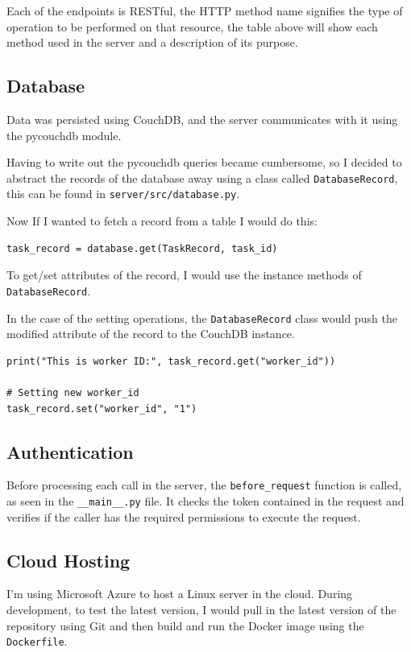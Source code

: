Each of the endpoints is RESTful, the HTTP method name signifies
the type of operation to be performed on that resource,
the table above will show each method used in the server
and a description of its purpose.

\subsection{Database}
Data was persisted using CouchDB,
and the server communicates with it using the pycouchdb module.

Having to write out the pycouchdb queries became cumbersome,
so I decided to abstract the records of the database away using a class called
\texttt{DatabaseRecord}, this can be found in \texttt{server/src/database.py}.

Now If I wanted to fetch a record from a table I would do this:
\begin{lstlisting}
task_record = database.get(TaskRecord, task_id)
\end{lstlisting}

To get/set attributes of the record,
I would use the instance methods of \\
\texttt{DatabaseRecord}.

In the case of the setting operations,
the \texttt{DatabaseRecord} class would push the modified attribute
of the record to the CouchDB instance.

\begin{lstlisting}
print("This is worker ID:", task_record.get("worker_id"))

# Setting new worker_id
task_record.set("worker_id", "1")
\end{lstlisting}

\subsection{Authentication}
Before processing each call in the server,
the \texttt{before\_request} function is called,
as seen in the \texttt{\_\_main\_\_.py} file.
It checks the token contained in the request and
verifies if the caller has the required permissions to execute the request.

\subsection{Cloud Hosting}
I'm using Microsoft Azure to host a Linux server in the cloud.
During development, to test the latest version,
I would pull in the latest version of the repository using Git and
then build and run the Docker image using the \texttt{Dockerfile}.

